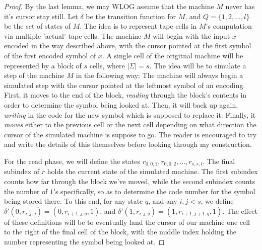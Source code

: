 \begin{proof}
	By the last lemma, we may WLOG assume that the machine $M$ never has it's cursor stay still. Let $\delta$ be the transition function for $M$, and $Q = \{1,2,...,l\}$ be the set of states of $M$. The idea is to represent tape cells in $M$'s computation via multiple 'actual' tape cells. 
	The machine $M$ will begin with the input $x$ encoded in the way described above, with the cursor pointed at the first symbol of the first encoded symbol of $x$. A single cell of the origitnal machine will be represented by a block of $s$ cells, where $|\Sigma| = s$. The idea will be to simulate a step of the machine $M$ in the following way: The machine will always begin a simulated step with the cursor pointed at the leftmost symbol of an encoding. First, it moves to the end of the block, \textit{reading} through the block's contents in order to determine the symbol being looked at. Then, it will back up again, \textit{writing} in the code for the new symbol which is supposed to replace it. Finally, it \textit{moves} either to the previous cell or the next cell depending on what direction the cursor of the simulated machine is suppose to go. The reader is encouraged to try and write the details of this themselves before looking through my construction. 

	For the read phase, we will define the states $r_{0,0,1},r_{0,0,2},...,r_{s,s,l}$. The final subindex of $r$ holds the current state of the simulated machine. The first subindex counts how far through the block we've moved, while the second subindex counts the number of $1$'s specifically, so as to determine the code number for the symbol being stored there. To this end, for any state $q$, and any $i,j <s$,  we define $\delta'(0,r_{i,j,q}) = (0,r_{i+1,j,q},1)$, and $\delta'(1,r_{i,j,q}) = (1,r_{i+1,j+1,q},1)$. The effect of these definitions will be to eventually land the cursor of our machine one cell to the right of the final cell of the block, with the middle index holding the number representing the symbol being looked at. 


\end{proof}
